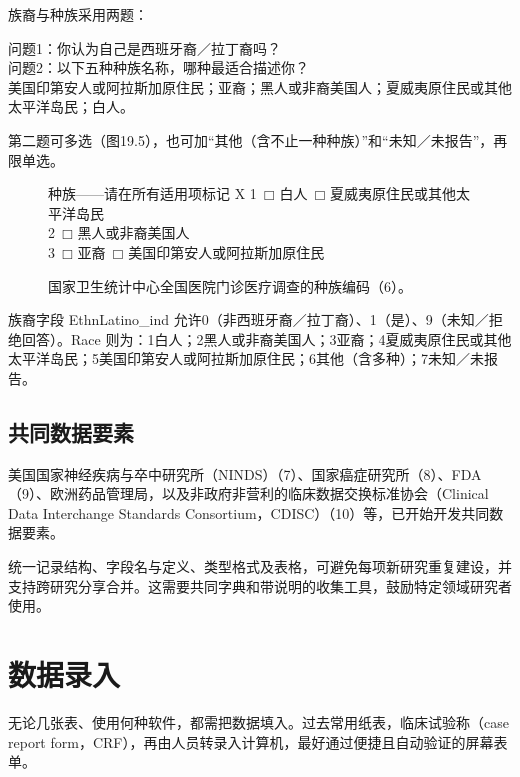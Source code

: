 族裔与种族采用两题：
\begin{studyquote}
问题1：你认为自己是西班牙裔／拉丁裔吗？\\
问题2：以下五种种族名称，哪种最适合描述你？\\
美国印第安人或阿拉斯加原住民；亚裔；黑人或非裔美国人；夏威夷原住民或其他太平洋岛民；白人。
\end{studyquote}
第二题可多选（图19.5），也可加“其他（含不止一种种族）”和“未知／未报告”，再限单选。
\begin{figure}[htbp]\centering
\begin{bookbox}{种族——请在所有适用项标记 X}
1\ $\mdlgwhtsquare$ 白人\ $\mdlgwhtsquare$ 夏威夷原住民或其他太平洋岛民\\
2\ $\mdlgwhtsquare$ 黑人或非裔美国人\\
3\ $\mdlgwhtsquare$ 亚裔\ $\mdlgwhtsquare$ 美国印第安人或阿拉斯加原住民
\end{bookbox}
\caption{国家卫生统计中心全国医院门诊医疗调查的种族编码（6）。}
\end{figure}
族裔字段 EthnLatino\_ind 允许0（非西班牙裔／拉丁裔）、1（是）、9（未知／拒绝回答）。Race 则为：1白人；2黑人或非裔美国人；3亚裔；4夏威夷原住民或其他太平洋岛民；5美国印第安人或阿拉斯加原住民；6其他（含多种）；7未知／未报告。

\subsection{共同数据要素}
美国国家神经疾病与卒中研究所（NINDS）（7）、国家癌症研究所（8）、FDA（9）、欧洲药品管理局，以及非政府非营利的临床数据交换标准协会（Clinical Data Interchange Standards Consortium，CDISC）（10）等，已开始开发共同数据要素。

统一记录结构、字段名与定义、类型格式及表格，可避免每项新研究重复建设，并支持跨研究分享合并。这需要共同字典和带说明的收集工具，鼓励特定领域研究者使用。

\section{数据录入}
无论几张表、使用何种软件，都需把数据填入。过去常用纸表，临床试验称（case report form，CRF），再由人员转录入计算机，最好通过便捷且自动验证的屏幕表单。
